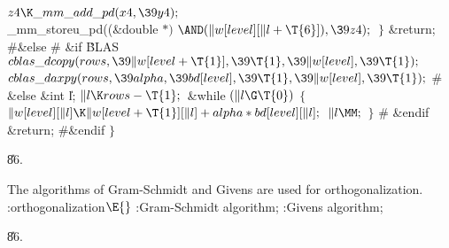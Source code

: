 ${}\\{z4}\K\\{\_mm\_add\_pd}(\\{x4},\39\\{y4});{}$\6
\\{\_mm\_storeu\_pd}((\&{double} ${}{*}){}$ ${}{\AND}(\|w[\\{level}][\|l+%
\T{6}]),\39\\{z4});{}$\6
\4${}\}{}$\2\6
\&{return};\6
\8\#\&{else}\6
$\#$ \6
\&{if} \.{BLAS}\1\5
${}\\{cblas\_dcopy}(\\{rows},\39\|w[\\{level}+\T{1}],\39\T{1},\39\|w[%
\\{level}],\39\T{1});{}$\2\6
${}\\{cblas\_daxpy}(\\{rows},\39\\{alpha},\39\\{bd}[\\{level}],\39\T{1},\39\|w[%
\\{level}],\39\T{1});$ $\#$ \6
\&{else}\1\5
\&{int} \|l;\7
${}\|l\K\\{rows}-\T{1};{}$\2\6
\&{while} ${}(\|l\G\T{0}){}$\5
${}\{{}$\1\6
${}\|w[\\{level}][\|l]\K\|w[\\{level}+\T{1}][\|l]+\\{alpha}*\\{bd}[\\{level}][%
\|l];{}$\6
${}\|l\MM;{}$\6
\4${}\}{}$\2\6
$\#$ \&{endif} \&{return};\6
\8\#\&{endif}\6
$\}{}$\par
\U86.\fi

The algorithms of Gram-Schmidt and Givens are used
for orthogonalization.
\Y\B\4:orthogonalization\X${}\E{}$\6
:Gram-Schmidt algorithm\X;\6
:Givens algorithm\X;\par
\U86.\fi

